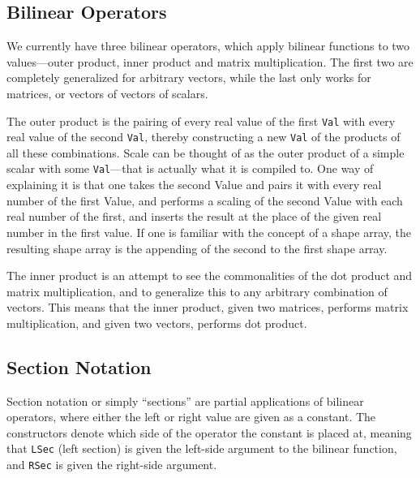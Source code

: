 \subsection{Bilinear Operators} We currently have three bilinear operators,
which apply bilinear functions to two values---outer product, inner product and
matrix multiplication. The first two are completely generalized for arbitrary
vectors, while the last only works for matrices, or vectors of vectors of
scalars.

The outer product is the pairing of every real value of the first \texttt{Val}
with every real value of the second \texttt{Val}, thereby constructing a new
\texttt{Val} of the products of all these combinations. Scale can be thought of
as the outer product of a simple scalar with some \texttt{Val}---that is
actually what it is compiled to. One way of explaining it is that one takes the
second Value and pairs it with every real number of the first Value, and
performs a scaling of the second Value with each real number of the first, and
inserts the result at the place of the given real number in the first value. If
one is familiar with the concept of a shape array, the resulting shape array is
the appending of the second to the first shape array.

The inner product is an attempt to see the commonalities of the dot product and
matrix multiplication, and to generalize this to any arbitrary combination of
vectors. This means that the inner product, given two matrices, performs matrix
multiplication, and given two vectors, performs dot product.

\subsection{Section Notation} Section notation or simply \enquote{sections} are
partial applications of bilinear operators, where either the left or right value
are given as a constant. The constructors denote which side of the operator the
constant is placed at, meaning that \texttt{LSec} (left section) is given the
left-side argument to the bilinear function, and \texttt{RSec} is given the
right-side argument.


